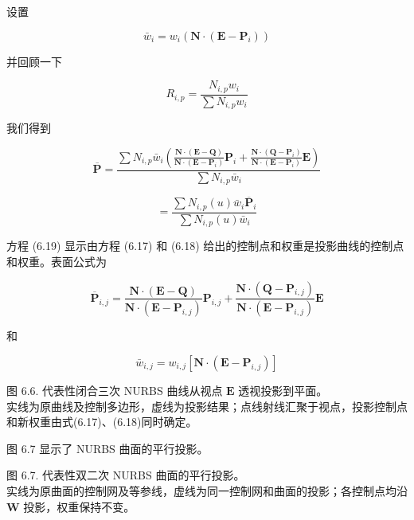 \documentclass[../main.tex]{subfiles}
\begin{document}
设置

\[
{\bar{w}}_{i} = {w}_{i}\left( {\mathbf{N} \cdot  \left( {\mathbf{E} - {\mathbf{P}}_{i}}\right) }\right)  \tag{6.18}
\]

并回顾一下

\[
{R}_{i,p} = \frac{{N}_{i,p}{w}_{i}}{\sum {N}_{i,p}{w}_{i}}
\]

我们得到

\[
\overline{\mathbf{P}} = \frac{\sum {N}_{i,p}{\bar{w}}_{i}\left( {\frac{\mathbf{N} \cdot  \left( {\mathbf{E} - \mathbf{Q}}\right) }{\mathbf{N} \cdot  \left( {\mathbf{E} - {\mathbf{P}}_{i}}\right) }{\mathbf{P}}_{i} + \frac{\mathbf{N} \cdot  \left( {\mathbf{Q} - {\mathbf{P}}_{i}}\right) }{\mathbf{N} \cdot  \left( {\mathbf{E} - {\mathbf{P}}_{i}}\right) }\mathbf{E}}\right) }{\sum {N}_{i,p}{\bar{w}}_{i}}
\]

\[
= \frac{\sum {N}_{i,p}\left( u\right) {\bar{w}}_{i}{\overline{\mathbf{P}}}_{i}}{\sum {N}_{i,p}\left( u\right) {\bar{w}}_{i}} \tag{6.19}
\]

方程 (6.19) 显示由方程 (6.17) 和 (6.18) 给出的控制点和权重是投影曲线的控制点和权重。表面公式为

\[
{\overline{\mathbf{P}}}_{i,j} = \frac{\mathbf{N} \cdot  \left( {\mathbf{E} - \mathbf{Q}}\right) }{\mathbf{N} \cdot  \left( {\mathbf{E} - {\mathbf{P}}_{i,j}}\right) }{\mathbf{P}}_{i,j} + \frac{\mathbf{N} \cdot  \left( {\mathbf{Q} - {\mathbf{P}}_{i,j}}\right) }{\mathbf{N} \cdot  \left( {\mathbf{E} - {\mathbf{P}}_{i,j}}\right) }\mathbf{E} \tag{6.20}
\]

和

\[
{\bar{w}}_{i,j} = {w}_{i,j}\left\lbrack  {\mathbf{N} \cdot  \left( {\mathbf{E} - {\mathbf{P}}_{i,j}}\right) }\right\rbrack   \tag{6.21}
\]

\begin{center}
\begin{minipage}{20cm}
\vspace*{.6\baselineskip}
\centering
{}
\par\smallskip
图 6.6. 代表性闭合三次 NURBS 曲线从视点 $\mathbf E$ 透视投影到平面。\\
实线为原曲线及控制多边形，虚线为投影结果；点线射线汇聚于视点，投影控制点和新权重由式(6.17)、(6.18)同时确定。
\end{minipage}
\end{center}

图 6.7 显示了 NURBS 曲面的平行投影。

\begin{center}
\begin{minipage}{20cm}
\vspace*{.6\baselineskip}
\centering
{}
\par\smallskip
图 6.7. 代表性双二次 NURBS 曲面的平行投影。\\
实线为原曲面的控制网及等参线，虚线为同一控制网和曲面的投影；各控制点均沿 $\mathbf W$ 投影，权重保持不变。
\end{minipage}
\end{center}
\end{document}
